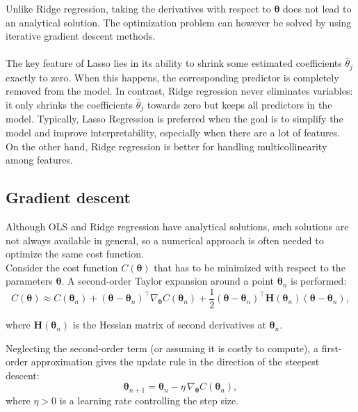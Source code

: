 \documentclass[
 reprint,            %
 amsmath,amssymb,
 aps,
]{revtex4-2}
\begin{document}
Unlike Ridge regression, taking the derivatives with respect to $\boldsymbol{\theta}$ does not lead to an analytical solution. 
The optimization problem can however be solved by using iterative gradient descent methods.\\ \\
The key feature of Lasso lies in its ability to shrink some estimated coefficients $\hat{\theta}_j$ exactly to zero. 
When this happens, the corresponding predictor is completely removed from the model.  
In contrast, Ridge regression never eliminates variables: it only shrinks the coefficients $\hat{\theta}_j$ towards zero but keeps all predictors in the model.
Typically, Lasso Regression is preferred when the goal is to simplify the model and improve interpretability, especially when there are a lot of features. On the other hand, Ridge regression is better for handling multicollinearity among features. 


\subsection{Gradient descent}

Although OLS and Ridge regression have analytical solutions, such solutions are not always available in general, so a numerical approach is often needed to optimize the same cost function.\\

Consider the cost function $C(\boldsymbol{\theta})$ that has to be minimized with respect to the parameters $\boldsymbol{\theta}$\cite{hjorthjensen_week36}.  
A second-order Taylor expansion around a point $\boldsymbol{\theta}_n$ is performed:
$$
C(\boldsymbol{\theta}) \approx C(\boldsymbol{\theta}_n) + (\boldsymbol{\theta}-\boldsymbol{\theta}_n)^\top \nabla_{\boldsymbol{\theta}} C(\boldsymbol{\theta}_n) 
+ \frac{1}{2} (\boldsymbol{\theta}-\boldsymbol{\theta}_n)^\top \mathbf{H}(\boldsymbol{\theta}_n) (\boldsymbol{\theta}-\boldsymbol{\theta}_n),
$$

where $\mathbf{H}(\boldsymbol{\theta}_n)$ is the Hessian matrix of second derivatives at $\boldsymbol{\theta}_n$.

Neglecting the second-order term (or assuming it is costly to compute), a first-order approximation gives the update rule in the direction of the steepest descent:
\[
\boldsymbol{\theta}_{n+1} = \boldsymbol{\theta}_n - \eta \, \nabla_{\boldsymbol{\theta}} C(\boldsymbol{\theta}_n),
\]
where $\eta > 0$ is a learning rate controlling the step size.  
\end{document}
